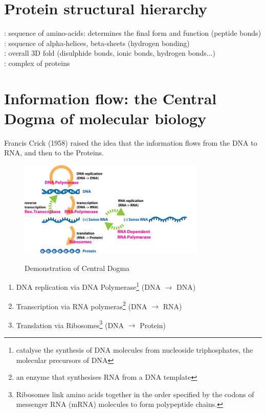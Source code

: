 \section{Protein structural hierarchy}

: sequence of amino-acids: determines the final form and function (peptide bonds)\\[.1in]
: sequence of alpha-helices, beta-sheets (hydrogen bonding)\\[.1in]
: overall 3D fold (disulphide bonds, ionic bonds, hydrogen bonds...)\\[.1in]
: complex of proteins

\section{Information flow: the Central Dogma of molecular biology}
Francis Crick (1958) raised the idea that the information flows from the DNA to RNA, and then to the Proteins.
\begin{figure}[h]
\centering
\includegraphics[width=0.8\textwidth]{images/Extended_Central_Dogma_with_Enzymes.jpg}\\[.2in]
\caption{Demonstration of Central Dogma} 
\end{figure}
\begin{enumerate}
    \item DNA replication via DNA Polymerase\footnote{catalyse the synthesis of DNA molecules from nucleoside triphosphates, the molecular precursors of DNA} (DNA $\rightarrow$ DNA)
    \item Transcription via RNA polymeras\footnote{an enzyme that synthesises RNA from a DNA template} (DNA $\rightarrow$ RNA)
    \item Translation via Ribosomes\footnote{Ribosomes link amino acids together in the order specified by the codons of messenger RNA (mRNA) molecules to form polypeptide chains.} (DNA $\rightarrow$ Protein)
\end{enumerate}


